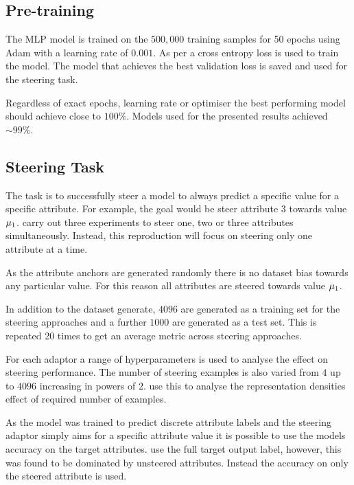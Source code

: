 \subsection{Pre-training}

The MLP model is trained on the $500,000$ training samples for 50 epochs using Adam \citep{adam} with a learning rate of $0.001$.
As per \citet{steering-clear} a cross entropy loss is used to train the model.
The model that achieves the best validation loss is saved and used for the steering task.

Regardless of exact epochs, learning rate or optimiser the best performing model should achieve close to $100\%$.
Models used for the presented results achieved $\sim 99\%$.

\subsection{Steering Task}

The task is to successfully steer a model to always predict a specific value for a specific attribute.
For example, the goal would be steer attribute $3$ towards value $\mathbf{\mu}_1$.
\citet{steering-clear} carry out three experiments to steer one, two or three attributes simultaneously.
Instead, this reproduction will focus on steering only one attribute at a time.

As the attribute anchors are generated randomly there is no dataset bias towards any particular value.
For this reason all attributes are steered towards value $\mathbf{\mu}_1$.

In addition to the dataset generate, $4096$ are generated as a training set for the steering approaches and a further $1000$ are generated as a test set.
This is repeated 20 times to get an average metric across steering approaches.

For each adaptor a range of hyperparameters is used to analyse the effect on steering performance.
The number of steering examples is also varied from $4$ up to $4096$ increasing in powers of $2$.
\citet{steering-clear} use this to analyse the representation densities effect of required number of examples.

 As the model was trained to predict discrete attribute labels and the steering adaptor simply aims for a specific attribute value it is possible to use the models accuracy on the target attributes.
\citet{steering-clear} use the full target output label, however, this was found to be dominated by unsteered attributes.
Instead the accuracy on only the steered attribute is used.

